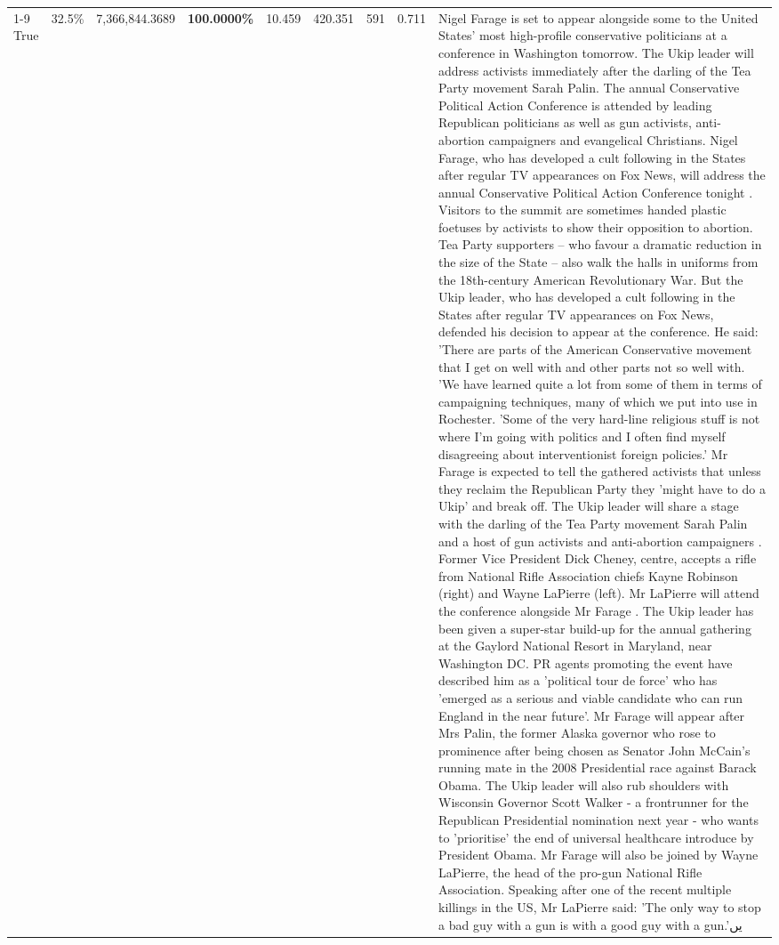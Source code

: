 \begin{table}[H]
\begin{tabular}{lllrlllll}
\cline{1-9}
True & 32.5\% & 7,366,844.3689 & \bfseries \color{red} 100.0000\% & 10.459 & 420.351 & 591 & 0.711 & Nigel Farage is set to appear alongside some to the United States' most high-profile conservative politicians at a conference in Washington tomorrow. The Ukip leader will address activists immediately after the darling of the Tea Party movement Sarah Palin. The annual Conservative Political Action Conference is attended by leading Republican politicians as well as gun activists, anti-abortion campaigners and evangelical Christians. Nigel Farage, who has developed a cult following in the States after regular TV appearances on Fox News, will address the annual Conservative Political Action Conference tonight . Visitors to the summit are sometimes handed plastic foetuses by activists to show their opposition to abortion. Tea Party supporters – who favour a dramatic reduction in the size of the State – also walk the halls in uniforms from the 18th-century American Revolutionary War. But the Ukip leader, who has developed a cult following in the States after regular TV appearances on Fox News, defended his decision to appear at the conference. He said: 'There are parts of the American Conservative movement that I get on well with and other parts not so well with. 'We have learned quite a lot from some of them in terms of campaigning techniques, many of which we put into use in Rochester. 'Some of the very hard-line religious stuff is not where I'm going with politics and I often find myself disagreeing about interventionist foreign policies.' Mr Farage is expected to tell the gathered activists that unless they reclaim the Republican Party they 'might have to do a Ukip' and break off. The Ukip leader will share a stage with the darling of the Tea Party movement Sarah Palin and a host of gun activists and anti-abortion campaigners . Former Vice President Dick Cheney, centre, accepts a rifle from National Rifle Association chiefs Kayne Robinson (right) and Wayne LaPierre (left). Mr LaPierre will attend the conference alongside Mr Farage . The Ukip leader has been given a super-star build-up for the annual gathering at the Gaylord National Resort in Maryland, near Washington DC. PR agents promoting the event have described him as a 'political tour de force' who has 'emerged as a serious and viable candidate who can run England in the near future'. Mr Farage will appear after Mrs Palin, the former Alaska governor who rose to prominence after being chosen as Senator John McCain's running mate in the 2008 Presidential race against Barack Obama. The Ukip leader will also rub shoulders with Wisconsin Governor Scott Walker - a frontrunner for the Republican Presidential nomination next year - who wants to 'prioritise' the end of universal healthcare introduce by President Obama. Mr Farage will also be joined by Wayne LaPierre, the head of the pro-gun National Rifle Association. Speaking after one of the recent multiple killings in the US, Mr LaPierre said: 'The only way to stop a bad guy with a gun is with a good guy with a gun.'يں \\

\end{tabular}
\end{table}
